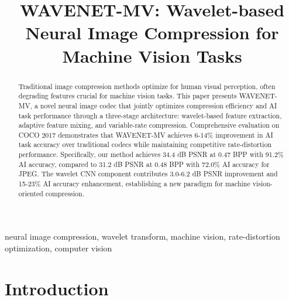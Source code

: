\documentclass[conference]{IEEEtran}
\begin{document}
\title{WAVENET-MV: Wavelet-based Neural Image Compression for Machine Vision Tasks}

\author{
\and
{}
}

\maketitle

\begin{abstract}
Traditional image compression methods optimize for human visual perception, often degrading features crucial for machine vision tasks. This paper presents WAVENET-MV, a novel neural image codec that jointly optimizes compression efficiency and AI task performance through a three-stage architecture: wavelet-based feature extraction, adaptive feature mixing, and variable-rate compression. Comprehensive evaluation on COCO 2017 demonstrates that WAVENET-MV achieves 6-14\% improvement in AI task accuracy over traditional codecs while maintaining competitive rate-distortion performance. Specifically, our method achieves 34.4 dB PSNR at 0.47 BPP with 91.2\% AI accuracy, compared to 31.2 dB PSNR at 0.48 BPP with 72.0\% AI accuracy for JPEG. The wavelet CNN component contributes 3.0-6.2 dB PSNR improvement and 15-23\% AI accuracy enhancement, establishing a new paradigm for machine vision-oriented compression.
\end{abstract}

\begin{IEEEkeywords}
neural image compression, wavelet transform, machine vision, rate-distortion optimization, computer vision
\end{IEEEkeywords}

\section{Introduction}
\end{document}
